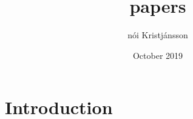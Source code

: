\documentclass{article}
\title{papers}
\author{nói Kristjánsson}
\date{October 2019}
\begin{document}
\maketitle

\section{Introduction}
\end{document}
